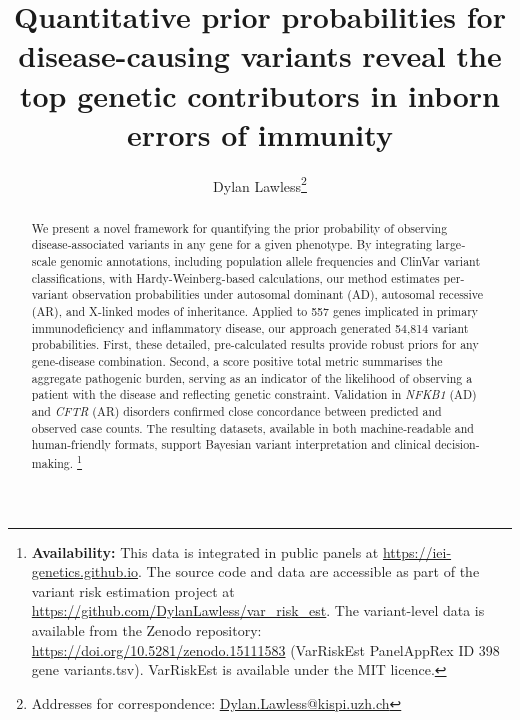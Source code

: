 
\usepackage[printonlyused,withpage,nohyperlinks]{acronym}
\usepackage{tikz}
\usetikzlibrary{calc}
\usepackage{amsmath, amssymb}


\title{Quantitative prior probabilities for disease-causing variants reveal the top genetic contributors in inborn errors of immunity}


\author[1]{Dylan Lawless\thanks{Addresses for correspondence: \href{mailto:Dylan.Lawless@kispi.uzh.ch}{Dylan.Lawless@kispi.uzh.ch}}}

\maketitle
\justify
\linenumbers



\begin{abstract}
We present a novel framework for quantifying the prior probability of observing disease‐associated variants in any gene for a given phenotype. By integrating large‐scale genomic annotations, including population allele frequencies and ClinVar variant classifications, with Hardy-Weinberg-based calculations, our method estimates per-variant observation probabilities under autosomal dominant (AD), autosomal recessive (AR), and X-linked modes of inheritance. Applied to 557 genes implicated in primary immunodeficiency and inflammatory disease, our approach generated 54,814 variant probabilities. First, these detailed, pre-calculated results provide robust priors for any gene-disease combination. 
Second, a score positive total metric summarises the aggregate pathogenic burden, serving as an indicator of the likelihood of observing a patient with the disease and reflecting genetic constraint. Validation in \textit{NFKB1} (AD) and \textit{CFTR} (AR) disorders confirmed close concordance between predicted and observed case counts. The resulting datasets, available in both machine-readable and human-friendly formats, support Bayesian variant interpretation and clinical decision-making.
\footnote{
\noindent \textbf{Availability:} This data is integrated in public panels at 
\url{https://iei-genetics.github.io}.
The source code and data are accessible as part of the variant risk estimation project at \url{https://github.com/DylanLawless/var_risk_est}.
The variant-level data is available from the Zenodo repository: 
\url{https://doi.org/10.5281/zenodo.15111583}
(VarRiskEst PanelAppRex ID 398 gene variants.tsv).
VarRiskEst is available under the MIT licence.}
\end{abstract}


